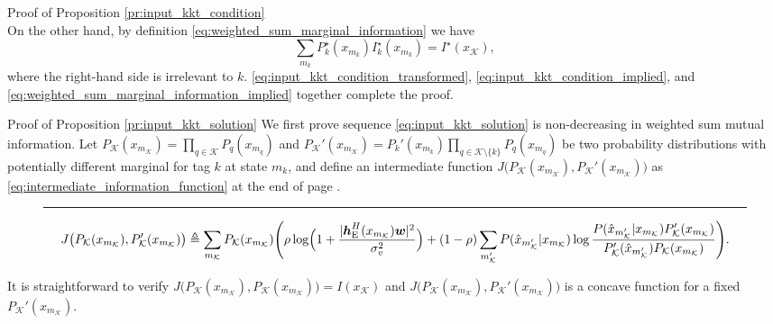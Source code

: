 \documentclass[journal]{IEEEtran}
\begin{document}
\begin{appendix}
\begin{subsection}{Proof of Proposition \ref{pr:input_kkt_condition}}
\begin{equation}
			\label{eq:input_kkt_condition_implied}
		\end{equation}
		On the other hand, by definition \eqref{eq:weighted_sum_marginal_information} we have
		\begin{equation}
			\sum_{m_k} P_k^\star(x_{m_k}) I_k^\star(x_{m_k}) = I^\star(x_{\mathcal{K}}),
			\label{eq:weighted_sum_marginal_information_implied}
		\end{equation}
		where the right-hand side is irrelevant to $k$.
		\eqref{eq:input_kkt_condition_transformed}, \eqref{eq:input_kkt_condition_implied}, and \eqref{eq:weighted_sum_marginal_information_implied} together complete the proof.
		\label{ap:input_kkt_condition}
	\end{subsection}

	\begin{subsection}{Proof of Proposition \ref{pr:input_kkt_solution}}
		We first prove sequence \eqref{eq:input_kkt_solution} is non-decreasing in weighted sum mutual information.
		Let $P_{\mathcal{K}}(x_{m_{\mathcal{K}}}) = \prod_{q \in \mathcal{K}} P_q(x_{m_q})$ and $P_{\mathcal{K}}'(x_{m_{\mathcal{K}}}) = P_k'(x_{m_k}) \prod_{q \in \mathcal{K} \setminus \{k\}} P_q(x_{m_q})$ be two probability distributions with potentially different marginal for tag $k$ at state $m_k$, and define an intermediate function $J \bigl( P_{\mathcal{K}}(x_{m_{\mathcal{K}}}),P_{\mathcal{K}}'(x_{m_{\mathcal{K}}}) \bigr)$ as \eqref{eq:intermediate_information_function} at the end of page \pageref{eq:intermediate_information_function}.
		\begin{figure*}[!b]
			\hrule
			\begin{equation}
				J \bigl( P_{\mathcal{K}}(x_{m_{\mathcal{K}}}),P_{\mathcal{K}}'(x_{m_{\mathcal{K}}}) \bigr) \triangleq \sum_{m_{\mathcal{K}}} P_{\mathcal{K}}(x_{m_{\mathcal{K}}})
				\Biggl( \rho \log \Bigl(1 + \frac{\lvert \boldsymbol{h}_{\mathrm{E}}^H(x_{m_{\mathcal{K}}}) \boldsymbol{w} \rvert^2}{\sigma_v^2}\Bigr) + (1 - \rho) \sum_{m_{\mathcal{K}}'} P(\hat{x}_{m_{\mathcal{K}}'}|x_{m_{\mathcal{K}}}) \log \frac{P(\hat{x}_{m_{\mathcal{K}}'}|x_{m_{\mathcal{K}}}) P_{\mathcal{K}}'(x_{m_{\mathcal{K}}})}{P_{\mathcal{K}}'(\hat{x}_{m_{\mathcal{K}}'}) P_{\mathcal{K}}(x_{m_{\mathcal{K}}})} \Biggr).
				\label{eq:intermediate_information_function}
			\end{equation}
		\end{figure*}
		It is straightforward to verify $J \bigl( P_{\mathcal{K}}(x_{m_{\mathcal{K}}}),P_{\mathcal{K}}(x_{m_{\mathcal{K}}}) \bigr) = I(x_{\mathcal{K}})$ and $J \bigl( P_{\mathcal{K}}(x_{m_{\mathcal{K}}}),P_{\mathcal{K}}'(x_{m_{\mathcal{K}}}) \bigr)$ is a concave function for a fixed $P_{\mathcal{K}}'(x_{m_{\mathcal{K}}})$.

\end{subsection}
\end{appendix}
\end{document}
